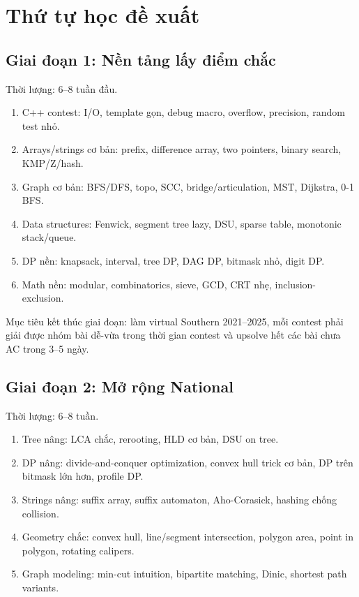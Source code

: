 \documentclass[11pt,a4paper]{article}
\begin{document}
\section{Thứ tự học đề xuất}

\subsection{Giai đoạn 1: Nền tảng lấy điểm chắc}

Thời lượng: 6--8 tuần đầu.

\begin{enumerate}
  \item C++ contest: I/O, template gọn, debug macro, overflow, precision, random test nhỏ.
  \item Arrays/strings cơ bản: prefix, difference array, two pointers, binary search, KMP/Z/hash.
  \item Graph cơ bản: BFS/DFS, topo, SCC, bridge/articulation, MST, Dijkstra, 0-1 BFS.
  \item Data structures: Fenwick, segment tree lazy, DSU, sparse table, monotonic stack/queue.
  \item DP nền: knapsack, interval, tree DP, DAG DP, bitmask nhỏ, digit DP.
  \item Math nền: modular, combinatorics, sieve, GCD, CRT nhẹ, inclusion-exclusion.
\end{enumerate}

Mục tiêu kết thúc giai đoạn: làm virtual Southern 2021--2025, mỗi contest phải giải được nhóm bài dễ-vừa trong thời gian contest và upsolve hết các bài chưa AC trong 3--5 ngày.

\subsection{Giai đoạn 2: Mở rộng National}

Thời lượng: 6--8 tuần.

\begin{enumerate}
  \item Tree nâng: LCA chắc, rerooting, HLD cơ bản, DSU on tree.
  \item DP nâng: divide-and-conquer optimization, convex hull trick cơ bản, DP trên bitmask lớn hơn, profile DP.
  \item Strings nâng: suffix array, suffix automaton, Aho-Corasick, hashing chống collision.
  \item Geometry chắc: convex hull, line/segment intersection, polygon area, point in polygon, rotating calipers.
  \item Graph modeling: min-cut intuition, bipartite matching, Dinic, shortest path variants.
\end{enumerate}
\end{document}
